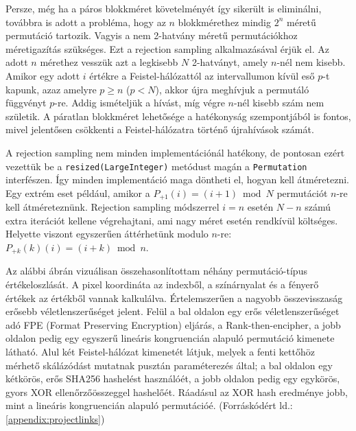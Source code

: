\documentclass[
    parspace,
    noindent,
    nohyp,
]{elteiktdk}[2023/04/10]
\begin{document}
Persze, még ha a páros blokkméret követelményét így sikerült is eliminálni,
továbbra is adott a probléma, hogy az $n$ blokkmérethez mindig $2^n$ méretű permutáció tartozik.
Vagyis a nem 2-hatvány méretű permutációkhoz méretigazítás szükséges.
Ezt a rejection sampling alkalmazásával érjük el.
Az adott $n$ mérethez vesszük azt a legkisebb $N$ 2-hatványt, amely $n$-nél nem kisebb.
Amikor egy adott $i$ értékre a Feistel-hálózattól az intervallumon kívül eső $p$-t kapunk,
azaz amelyre $p \geq n$ ($p < N$), akkor újra meghívjuk a permutáló függvényt $p$-re.
Addig ismételjük a hívást, míg végre $n$-nél kisebb szám nem születik.
A páratlan blokkméret lehetősége a hatékonyság szempontjából is fontos,
mivel jelentősen csökkenti a Feistel-hálózatra történő újrahívások számát.

A rejection sampling nem minden implementációnál hatékony,
de pontosan ezért vezettük be a \texttt{resized(LargeInteger)} metódust
magán a \texttt{Permutation} interfészen.
Így minden implementáció maga döntheti el, hogyan kell átméretezni.
Egy extrém eset például, amikor a $P_{+1}(i) = (i + 1) \bmod N$ permutációt $n$-re kell átméreteznünk.
Rejection sampling módszerrel $i = n$ esetén $N - n$ számú extra iterációt kellene végrehajtani,
ami nagy méret esetén rendkívül költséges.
Helyette viszont egyszerűen áttérhetünk modulo $n$-re: $P_{+k}(k)(i) = (i + k) \bmod n$.

Az alábbi ábrán vizuálisan összehasonlítottam néhány permutáció-típus értékeloszlását.
A pixel koordináta az indexből, a színárnyalat és a fényerő értékek az értékből vannak kalkulálva.
Értelemszerűen a nagyobb összevisszaság erősebb véletlenszerűséget jelent.
Felül a bal oldalon egy erős véletlenszerűséget adó FPE (Format Preserving Encryption) eljárás,
a Rank-then-encipher\protect\cite{Bellare2009FormatPreservingE},
a jobb oldalon pedig egy egyszerű lineáris kongruencián alapuló permutáció kimenete látható.
Alul két Feistel-hálózat kimenetét látjuk,
melyek a fenti kettőhöz mérhető skálázódást mutatnak pusztán paraméterezés által;
a bal oldalon egy kétkörös, erős SHA256 hashelést használóét,
a jobb oldalon pedig egy egykörös, gyors XOR ellenőrzőösszeggel hashelőét.
Ráadásul az XOR hash eredménye jobb, mint a lineáris kongruencián alapuló permutációé.
(Forráskódért ld.: \autoref{appendix:projectlinks})
\end{document}
